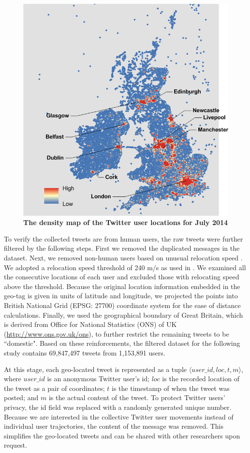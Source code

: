 \documentclass[10pt,letterpaper]{article}
\begin{document}
\begin{figure}[ht]
\includegraphics[width=0.7\linewidth]{./figure/PNG/S2_twitter_density_Fig_1}
\caption{{\bf The density map of the Twitter user locations for July 2014}}
\label{S2_Fig}
\end{figure}

To verify the collected tweets are from human users, the raw tweets were further filtered by the following steps. 
First we removed the duplicated messages in the dataset.
Next, we removed non-human users based on unusual relocation speed \cite{hawelka,jurdak2015}. 
We adopted a relocation speed threshold of 240 m/s as used in \cite{jurdak2015}. 
We examined all the consecutive locations of each user and excluded those with relocating speed above the threshold.
Because the original location information embedded in the geo-tag is given in units of latitude and longitude, we projected the points into British National Grid (EPSG: 27700) coordinate system for the ease of distance calculations. 
Finally, we used the geographical boundary of Great Britain, which is derived from Office for National Statistics (ONS) of UK (\url{http://www.ons.gov.uk/ons}), to further restrict the remaining tweets to be ``domestic".
Based on these reinforcements, the filtered dataset for the following study contains 69,847,497 tweets from 1,153,891 users.

At this stage, each geo-located tweet is represented as a tuple $\langle user\_id, loc, t, m \rangle$, where $user\_id$ is an anonymous Twitter user’s id; $loc$ is the recorded location of the tweet as a pair of coordinates; $t$ is the timestamp of when the tweet was posted; and $m$ is the actual content of the tweet. 
To protect Twitter users’ privacy, the id field was replaced with a randomly generated unique number. 
Because we are interested in the collective Twitter user movements instead of individual user trajectories, the content of the message was removed. 
This simplifies the geo-located tweets and can be shared with other researchers upon request.
\end{document}
